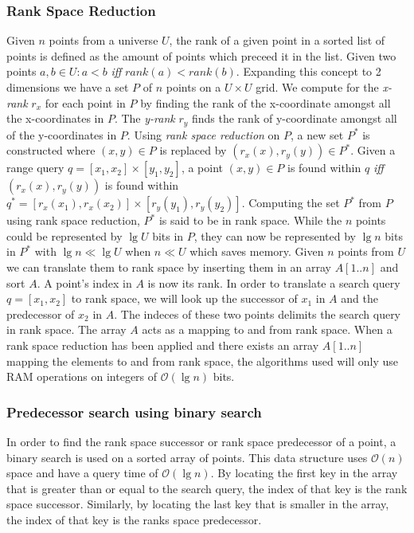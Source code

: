 \subsubsection{Rank Space Reduction}
Given $n$ points from a universe $U$, the rank of a given point in a sorted list of points is defined as the amount of points which preceed it in the list. Given two points $a,b \in U: a < b$ \emph{iff} $rank(a) < rank(b)$. Expanding this concept to 2 dimensions we have a set $P$ of $n$ points on a $U \times U$ grid. We compute for the \emph{x-rank} $r_x$ for each point in $P$ by finding the rank of the x-coordinate amongst all the x-coordinates in $P$. The \emph{y-rank} $r_y$ finds the rank of y-coordinate amongst all of the y-coordinates in $P$. Using \emph{rank space reduction} on $P$, a new set $P^*$ is constructed where $(x,y) \in P$ is replaced by $(r_x(x), r_y(y)) \in P^*$. Given a range query $q = [x_1, x_2] \times [y_1, y_2]$, a point $(x,y) \in P$ is found within $q$ \emph{iff} $(r_x(x), r_y(y))$ is found within $q^* = [r_x(x_1), r_x(x_2)] \times [r_y(y_1), r_y(y_2)]$. Computing the set $P^*$ from $P$ using rank space reduction, $P^*$ is said to be in rank space. While the $n$ points could be represented by $\lg U$ bits in $P$, they can now be represented by $\lg n$ bits in $P^*$ with $\lg n \ll \lg U$ when $n \ll U$ which saves memory. Given $n$ points from $U$ we can translate them to rank space by inserting them in an array $A[1..n]$ and sort $A$. A point's index in $A$ is now its rank. In order to translate a search query $q = [x_1, x_2]$ to rank space, we will look up the successor of $x_1$ in $A$ and the predecessor of $x_2$ in $A$. The indeces of these two points delimits the search query in rank space. The array $A$ acts as a mapping to and from rank space.  When a rank space reduction has been applied and there exists an array $A[1..n]$ mapping the elements to and from rank space, the algorithms used will only use RAM operations on integers of $\mathcal{O}(\lg n)$ bits.

\subsubsection{Predecessor search using binary search}
In order to find the rank space successor or rank space predecessor of a point, a binary search is used on a sorted array of points. This data structure uses $\mathcal{O}(n)$ space and have a query time of $\mathcal{O}(\lg n)$. By locating the first key in the array that is greater than or equal to the search query, the index of that key is the rank space successor. Similarly, by locating the last key that is smaller in the array, the index of that key is the ranks space predecessor.



